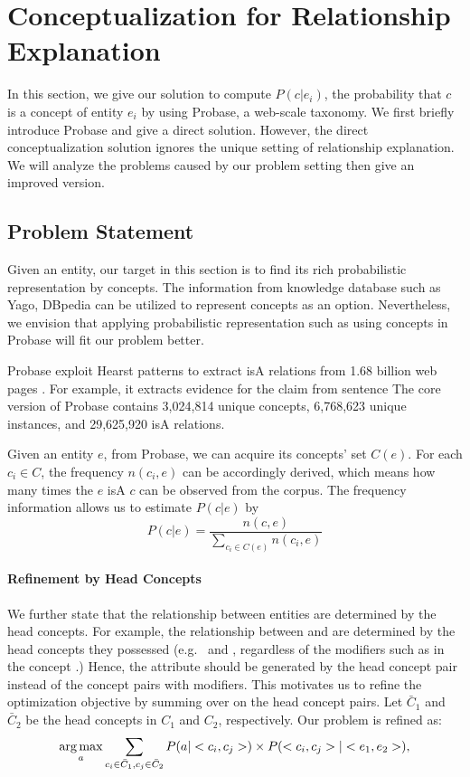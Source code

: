 \section{Conceptualization for Relationship Explanation}
\label{sec:conceptualization}
In this section, we give our solution to compute $P(c|e_i)$, the probability that $c$ is a concept of entity $e_i$ by using \ac{Probase}, a web-scale taxonomy. 
We first briefly introduce Probase and give a direct solution.
However, the direct conceptualization solution ignores the unique setting of relationship explanation. 
We will analyze the problems caused by our problem setting then give an improved version.

\subsection{Problem Statement}
Given an entity, our target in this section is to find its rich probabilistic representation by concepts.
The  information from knowledge database such as Yago, DBpedia can be utilized to represent concepts as an option.
Nevertheless, we envision that applying probabilistic representation such as using concepts in \ac{Probase} will fit our problem better.

Probase exploit Hearst patterns to extract isA relations from 1.68 billion web pages .
For example, it extracts evidence for the claim  from sentence 
The core version of Probase contains 3,024,814 unique concepts, 6,768,623 unique instances, and 29,625,920 isA relations.

Given an entity $e$, from Probase, we can acquire its concepts' set $C(e)$.
For each $c_i \in C$, the frequency $n(c_i,e)$ can be accordingly derived, which means how many times the $e$ isA $c$ can be observed from the corpus.
The frequency information allows us to estimate  $P(c|e)$ by
$$P(c|e)=\frac{n(c,e)}{\sum_{c_i\in C(e)}n(c_i, e)}$$


\paragraph{Refinement by Head Concepts}
We further state that the relationship between entities are determined by the head concepts.
For example, the  relationship between  and  are determined by the head concepts they possessed (e.g.\  and , regardless of the modifiers such as  in the concept .) 
Hence, the attribute should be generated by the head concept pair instead of the concept pairs with modifiers. 
This motivates us to refine the optimization objective by summing over on the head concept pairs. 
Let $\bar{C}_1$ and $\bar{C}_2$ be the head concepts in  $C_1$ and $C_2$, respectively. 
Our problem is refined as:
\begin{equation}
\label{eq:target}
\operatorname*{arg\,max}_a \sum_{c_i\in \bar{C}_1 , c_j \in \bar{C}_2 }P(a|<c_{i},c_{j}>)\times P(<c_{i},c_{j}>|<e_{1},e_{2}>),
\end{equation}

